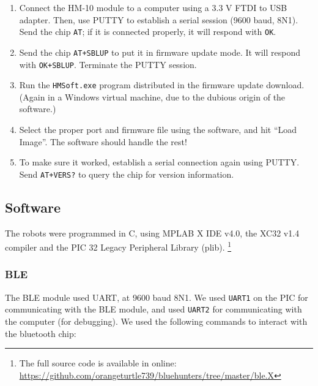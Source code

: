 \documentclass[]{article}
\begin{document}
\begin{enumerate}
\item
  Connect the HM-10 module to a computer using a 3.3 V FTDI to USB
  adapter. Then, use PUTTY to establish a serial session (9600 baud,
  8N1). Send the chip \texttt{AT}; if it is connected properly, it will
  respond with \texttt{OK}.
\item
  Send the chip \texttt{AT+SBLUP} to put it in firmware update mode. It
  will respond with \texttt{OK+SBLUP}. Terminate the PUTTY session.
\item
  Run the \texttt{HMSoft.exe} program distributed in the firmware update
  download. (Again in a Windows virtual machine, due to the dubious origin of the software.)
\item
  Select the proper port and firmware file using the software, and hit
  ``Load Image''. The software should handle the rest!
\item
  To make sure it worked, establish a serial connection again using
  PUTTY. Send \texttt{AT+VERS?} to query the chip for version
  information.
\end{enumerate}

\subsection{Software}

The robots were programmed in C, using MPLAB X IDE v4.0, the XC32 v1.4
compiler and the PIC 32 Legacy Peripheral Library (plib). \footnote{
The full source code is available in online: \url{https://github.com/orangeturtle739/bluehunters/tree/master/ble.X}}

\subsubsection{BLE}

The BLE module used UART, at 9600 baud 8N1. We used \texttt{UART1} on
the PIC for communicating with the BLE module, and used \texttt{UART2}
for communicating with the computer (for debugging).
We used the following commands to interact with the bluetooth chip:
\end{document}
